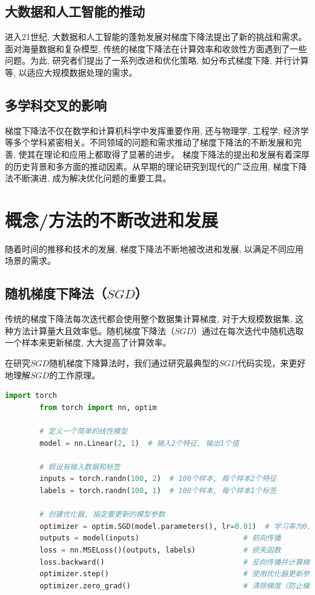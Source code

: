 \documentclass[printMode=true, declarePage=false]{ecnuthesis}
\begin{document}
    \subsection{大数据和人工智能的推动}
    进入21世纪, 大数据和人工智能的蓬勃发展对梯度下降法提出了新的挑战和需求。面对海量数据和复杂模型, 传统的梯度下降法在计算效率和收敛性方面遇到了一些问题。为此, 研究者们提出了一系列改进和优化策略, 如分布式梯度下降, 并行计算等, 以适应大规模数据处理的需求。

    \subsection{多学科交叉的影响}
    梯度下降法不仅在数学和计算机科学中发挥重要作用, 还与物理学, 工程学, 经济学等多个学科紧密相关。不同领域的问题和需求推动了梯度下降法的不断发展和完善, 使其在理论和应用上都取得了显著的进步。
    梯度下降法的提出和发展有着深厚的历史背景和多方面的推动因素。从早期的理论研究到现代的广泛应用, 梯度下降法不断演进, 成为解决优化问题的重要工具。


    \section{概念/方法的不断改进和发展}

    随着时间的推移和技术的发展, 梯度下降法不断地被改进和发展, 以满足不同应用场景的需求。

    \subsection{随机梯度下降法（$SGD$）}
    传统的梯度下降法每次迭代都会使用整个数据集计算梯度, 对于大规模数据集, 这种方法计算量大且效率低。随机梯度下降法（$SGD$）通过在每次迭代中随机选取一个样本来更新梯度, 大大提高了计算效率。

    在研究$SGD$随机梯度下降算法时，我们通过研究最典型的$SGD$代码实现，来更好地理解$SGD$的工作原理。

    \begin{lstlisting}[language = python, title = {$SGD\ Algorithm$}]
        import torch
        from torch import nn, optim
        
        # 定义一个简单的线性模型
        model = nn.Linear(2, 1)  # 输入2个特征, 输出1个值
        
        # 假设有输入数据和标签
        inputs = torch.randn(100, 2)  # 100个样本, 每个样本2个特征
        labels = torch.randn(100, 1)  # 100个样本, 每个样本1个标签
        
        # 创建优化器, 指定要更新的模型参数
        optimizer = optim.SGD(model.parameters(), lr=0.01)  # 学习率为0.01
        outputs = model(inputs)                        # 前向传播
        loss = nn.MSELoss()(outputs, labels)           # 损失函数
        loss.backward()                                # 反向传播并计算梯度
        optimizer.step()                               # 使用优化器更新参数
        optimizer.zero_grad()                          # 清除梯度（防止梯度累积）
    \end{lstlisting}
\end{document}
